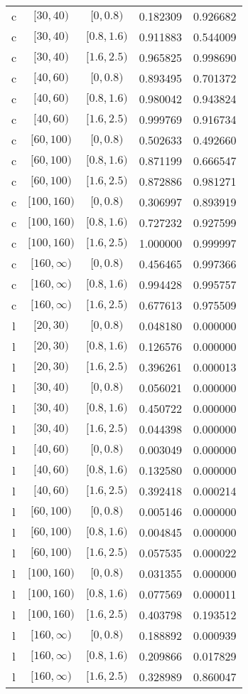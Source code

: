 \documentclass[12pt,a4paper]{article}
\begin{document}
\begin{table}[H]
\begin{center}
\begin{tabular}{ c | c | c | c | c }
		c & $[30,40)$ & $[0,0.8)$ & 0.182309 & 0.926682 \\
		c & $[30,40)$ & $[0.8,1.6)$ & 0.911883 & 0.544009 \\
		c & $[30,40)$ & $[1.6,2.5)$ & 0.965825 & 0.998690 \\
		c & $[40,60)$ & $[0,0.8)$ & 0.893495 & 0.701372 \\
		c & $[40,60)$ & $[0.8,1.6)$ & 0.980042 & 0.943824 \\
		c & $[40,60)$ & $[1.6,2.5)$ & 0.999769 & 0.916734 \\
		c & $[60,100)$ & $[0,0.8)$ & 0.502633 & 0.492660 \\
		c & $[60,100)$ & $[0.8,1.6)$ & 0.871199 & 0.666547 \\
		c & $[60,100)$ & $[1.6,2.5)$ & 0.872886 & 0.981271 \\
		c & $[100,160)$ & $[0,0.8)$ & 0.306997 & 0.893919 \\
		c & $[100,160)$ & $[0.8,1.6)$ & 0.727232 & 0.927599 \\
		c & $[100,160)$ & $[1.6,2.5)$ & 1.000000 & 0.999997 \\
		c & $[160,\infty)$ & $[0,0.8)$ & 0.456465 & 0.997366 \\
		c & $[160,\infty)$ & $[0.8,1.6)$ & 0.994428 & 0.995757 \\
		c & $[160,\infty)$ & $[1.6,2.5)$ & 0.677613 & 0.975509 \\ \hline
		l & $[20,30)$ & $[0,0.8)$ & 0.048180 & 0.000000 \\
		l & $[20,30)$ & $[0.8,1.6)$ & 0.126576 & 0.000000 \\
		l & $[20,30)$ & $[1.6,2.5)$ & 0.396261 & 0.000013 \\
		l & $[30,40)$ & $[0,0.8)$ & 0.056021 & 0.000000 \\
		l & $[30,40)$ & $[0.8,1.6)$ & 0.450722 & 0.000000 \\
		l & $[30,40)$ & $[1.6,2.5)$ & 0.044398 & 0.000000 \\
		l & $[40,60)$ & $[0,0.8)$ & 0.003049 & 0.000000 \\
		l & $[40,60)$ & $[0.8,1.6)$ & 0.132580 & 0.000000 \\
		l & $[40,60)$ & $[1.6,2.5)$ & 0.392418 & 0.000214 \\
		l & $[60,100)$ & $[0,0.8)$ & 0.005146 & 0.000000 \\
		l & $[60,100)$ & $[0.8,1.6)$ & 0.004845 & 0.000000 \\
		l & $[60,100)$ & $[1.6,2.5)$ & 0.057535 & 0.000022 \\
		l & $[100,160)$ & $[0,0.8)$ & 0.031355 & 0.000000 \\
		l & $[100,160)$ & $[0.8,1.6)$ & 0.077569 & 0.000011 \\
		l & $[100,160)$ & $[1.6,2.5)$ & 0.403798 & 0.193512 \\
		l & $[160,\infty)$ & $[0,0.8)$ & 0.188892 & 0.000939 \\
		l & $[160,\infty)$ & $[0.8,1.6)$ & 0.209866 & 0.017829 \\
		l & $[160,\infty)$ & $[1.6,2.5)$ & 0.328989 & 0.860047 \\
	\end{tabular}
\end{center}
\end{table}
\end{document}
